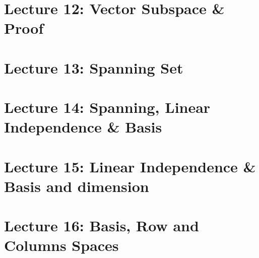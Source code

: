 \documentclass[oneside]{book}
\begin{document}
\section{Lecture 12: Vector Subspace \& Proof}





\section{Lecture 13: Spanning Set}





\section{Lecture 14: Spanning, Linear Independence \& Basis}


\section{Lecture 15: Linear Independence \& Basis and dimension}


\section{Lecture 16: Basis, Row and Columns Spaces}
\end{document}
